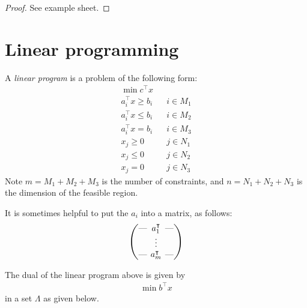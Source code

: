 \documentclass{../../template/note}
\begin{document}
    \begin{proof}
        See example sheet.
    \end{proof}    

    \section{Linear programming}

    \begin{definition}
        A \emph{linear program} is a problem of the following form:
        \begin{align*}
            \min c^\intercal x \\
            a_i^\intercal x \geq b_i && i \in M_1 \\
            a_i^\intercal x \leq b_i && i \in M_2 \\
            a_i^\intercal x = b_i && i \in M_3 \\
            x_j \geq 0 && j \in N_1 \\
            x_j \leq 0 && j \in N_2 \\
            x_j = 0 && j \in N_3
        \end{align*}
        Note $m = M_1 + M_2 + M_3$ is the number of constraints, and $n = N_1 + N_2 + N_3$ is the dimension of the feasible region.        

        It is sometimes helpful to put the $a_i$ into a matrix, as follows:
        \begin{align*}
            \begin{pmatrix}
                \lln & a_1^\intercal & \rln \\ 
                 & \vdots & \\ 
                \lln & a_m^\intercal & \rln \\ 
            \end{pmatrix}
        \end{align*}
        
        
    \end{definition}
    
    \begin{theorem}
        The dual of the linear program above is given by
        \begin{align*}
            \min b^\intercal x
        \end{align*}
        in a set $\Lambda$ as given below.
        
    \end{theorem}
    
\end{document}
